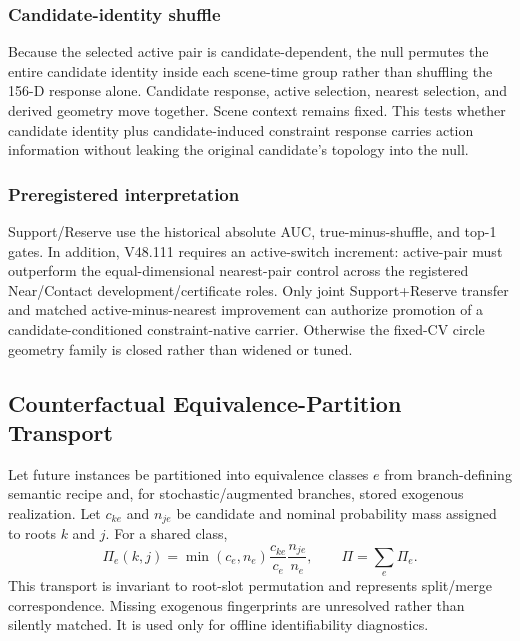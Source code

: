\documentclass[conference]{IEEEtran}
\begin{document}
\subsubsection{Candidate-identity shuffle}
Because the selected active pair is candidate-dependent, the null permutes the entire candidate identity inside each scene-time group rather than shuffling the 156-D response alone. Candidate response, active selection, nearest selection, and derived geometry move together. Scene context remains fixed. This tests whether candidate identity plus candidate-induced constraint response carries action information without leaking the original candidate's topology into the null.

\subsubsection{Preregistered interpretation}
Support/Reserve use the historical absolute AUC, true-minus-shuffle, and top-1 gates. In addition, V48.111 requires an active-switch increment: active-pair must outperform the equal-dimensional nearest-pair control across the registered Near/Contact development/certificate roles. Only joint Support+Reserve transfer and matched active-minus-nearest improvement can authorize promotion of a candidate-conditioned constraint-native carrier. Otherwise the fixed-CV circle geometry family is closed rather than widened or tuned.

\subsection{Counterfactual Equivalence-Partition Transport}
Let future instances be partitioned into equivalence classes $e$ from branch-defining semantic recipe and, for stochastic/augmented branches, stored exogenous realization. Let $c_{ke}$ and $n_{je}$ be candidate and nominal probability mass assigned to roots $k$ and $j$. For a shared class,
\begin{equation}
 \Pi_e(k,j)=\min(c_e,n_e)\frac{c_{ke}}{c_e}\frac{n_{je}}{n_e},\qquad \Pi=\sum_e\Pi_e.
\end{equation}
This transport is invariant to root-slot permutation and represents split/merge correspondence. Missing exogenous fingerprints are unresolved rather than silently matched. It is used only for offline identifiability diagnostics.
\end{document}
